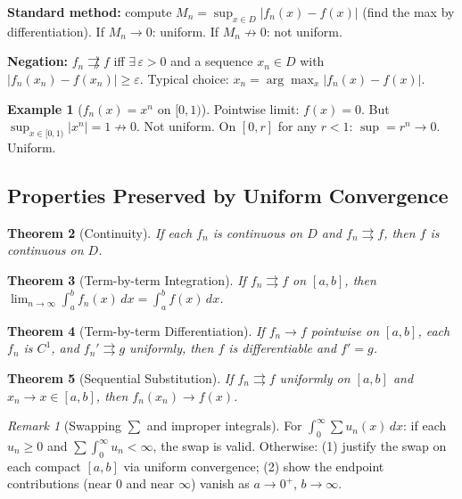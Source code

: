 \documentclass[12pt, a4paper]{article}
\newtheorem{theorem}{Theorem}[section]
\theoremstyle{definition}
\newtheorem{example}[theorem]{Example}
\theoremstyle{remark}
\newtheorem*{remark}{Remark}
\begin{document}
\textbf{Standard method:} compute $M_n = \sup_{x\in D}|f_n(x)-f(x)|$ (find the max by differentiation).
If $M_n \to 0$: uniform. If $M_n \not\to 0$: not uniform.

\textbf{Negation:} $f_n \not\rightrightarrows f$ iff $\exists\,\varepsilon > 0$ and a sequence $x_n \in D$ with $|f_n(x_n) - f(x_n)| \geq \varepsilon$.
Typical choice: $x_n = \arg\max_x |f_n(x) - f(x)|$.

\begin{example}[$f_n(x) = x^n$ on $[0,1)$]
Pointwise limit: $f(x) = 0$. But $\sup_{x\in[0,1)}|x^n| = 1 \not\to 0$. Not uniform.
On $[0,r]$ for any $r < 1$: $\sup = r^n \to 0$. Uniform.
\end{example}

\subsection{Properties Preserved by Uniform Convergence}

\begin{theorem}[Continuity]
If each $f_n$ is continuous on $D$ and $f_n \rightrightarrows f$, then $f$ is continuous on $D$.
\end{theorem}

\begin{theorem}[Term-by-term Integration]
If $f_n \rightrightarrows f$ on $[a,b]$, then
$\displaystyle\lim_{n\to\infty}\int_a^b f_n(x)\,dx = \int_a^b f(x)\,dx$.
\end{theorem}

\begin{theorem}[Term-by-term Differentiation]
If $f_n \to f$ pointwise on $[a,b]$, each $f_n$ is $C^1$, and $f_n' \rightrightarrows g$ uniformly,
then $f$ is differentiable and $f' = g$.
\end{theorem}

\begin{theorem}[Sequential Substitution]
If $f_n \rightrightarrows f$ uniformly on $[a,b]$ and $x_n \to x \in [a,b]$, then $f_n(x_n) \to f(x)$.
\end{theorem}

\begin{remark}[Swapping $\sum$ and improper integrals]
For $\int_0^\infty \sum u_n(x)\,dx$: if each $u_n \ge 0$ and $\sum \int_0^\infty u_n < \infty$,
the swap is valid. Otherwise: (1) justify the swap on each compact $[a,b]$ via uniform convergence;
(2) show the endpoint contributions (near $0$ and near $\infty$) vanish as $a\to 0^+$, $b\to\infty$.
\end{remark}
\end{document}
